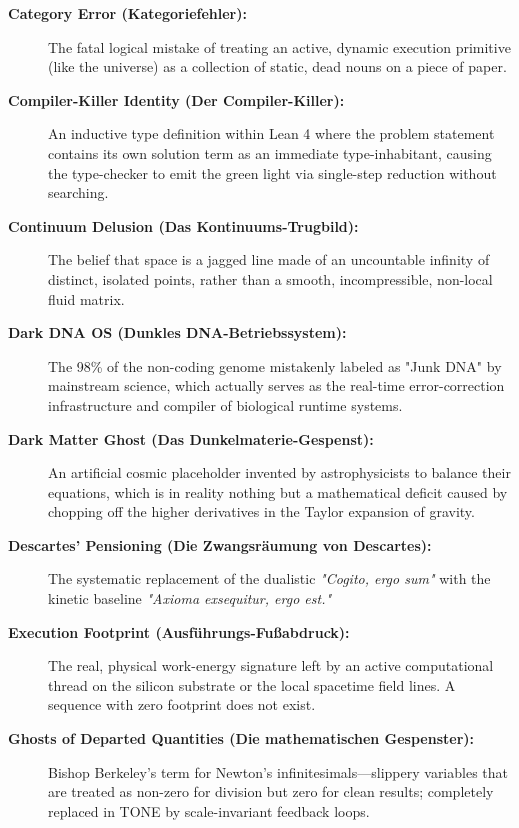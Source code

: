 \documentclass[11pt,a4paper]{article}
\begin{document}
\begin{description}
    \item[\textbf{Category Error (Kategoriefehler):}] The fatal logical mistake of treating an active, dynamic execution primitive (like the universe) as a collection of static, dead nouns on a piece of paper.
    
    \item[\textbf{Compiler-Killer Identity (Der Compiler-Killer):}] An inductive type definition within Lean 4 where the problem statement contains its own solution term as an immediate type-inhabitant, causing the type-checker to emit the green light via single-step reduction without searching.
    
    \item[\textbf{Continuum Delusion (Das Kontinuums-Trugbild):}] The belief that space is a jagged line made of an uncountable infinity of distinct, isolated points, rather than a smooth, incompressible, non-local fluid matrix.
    
    \item[\textbf{Dark DNA OS (Dunkles DNA-Betriebssystem):}] The 98\% of the non-coding genome mistakenly labeled as "Junk DNA" by mainstream science, which actually serves as the real-time error-correction infrastructure and compiler of biological runtime systems.
    
    \item[\textbf{Dark Matter Ghost (Das Dunkelmaterie-Gespenst):}] An artificial cosmic placeholder invented by astrophysicists to balance their equations, which is in reality nothing but a mathematical deficit caused by chopping off the higher derivatives in the Taylor expansion of gravity.
    
    \item[\textbf{Descartes' Pensioning (Die Zwangsräumung von Descartes):}] The systematic replacement of the dualistic \textit{"Cogito, ergo sum"} with the kinetic baseline \textit{"Axioma exsequitur, ergo est."}
    
    \item[\textbf{Execution Footprint (Ausführungs-Fußabdruck):}] The real, physical work-energy signature left by an active computational thread on the silicon substrate or the local spacetime field lines. A sequence with zero footprint does not exist.
    
    \item[\textbf{Ghosts of Departed Quantities (Die mathematischen Gespenster):}] Bishop Berkeley's term for Newton’s infinitesimals—slippery variables that are treated as non-zero for division but zero for clean results; completely replaced in TONE by scale-invariant feedback loops.
    

\end{description}
\end{document}
